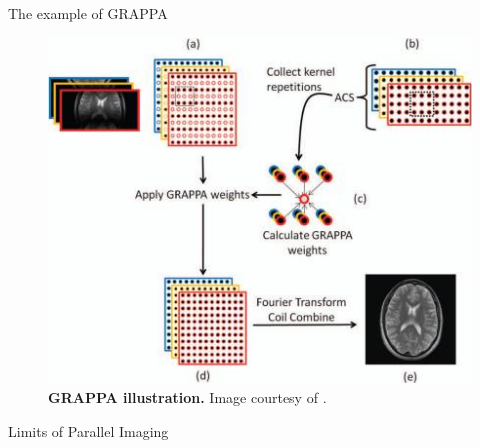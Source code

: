 \begin{frame}{The example of GRAPPA}
    \begin{figure}
        \centering
        \includegraphics[height=0.6\textheight]{Figures/intro_figures/GRAPPA.jpeg}
        \caption{\label{fig:GRAPPA}\textbf{GRAPPA illustration.} Image courtesy of \citet{deshmane2012parallel}.
        }
    \end{figure} 
\end{frame}

\begin{frame}{Limits of Parallel Imaging}
\end{frame}